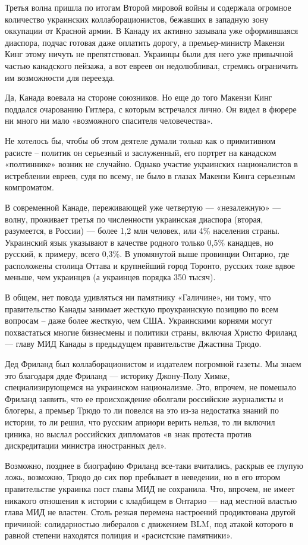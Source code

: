 \documentclass[a4paper,11pt]{extreport}
\begin{document}
Третья волна пришла по итогам Второй мировой войны и содержала огромное
количество украинских коллаборационистов, бежавших в западную зону оккупации от
Красной армии. В Канаду их активно зазывала уже оформившаяся диаспора, подчас
готовая даже оплатить дорогу, а премьер-министр Макензи Кинг этому ничуть не
препятствовал. Украинцы были для него уже привычной частью канадского пейзажа,
а вот евреев он недолюбливал, стремясь ограничить им возможности для переезда.

Да, Канада воевала на стороне союзников. Но еще до того Макензи Кинг поддался
очарованию Гитлера, с которым встречался лично. Он видел в фюрере ни много ни
мало «возможного спасителя человечества».

Не хотелось бы, чтобы об этом деятеле думали только как о примитивном расисте –
политик он серьезный и заслуженный, его портрет на канадском «полтиннике»
возник не случайно. Однако участие украинских националистов в истреблении
евреев, судя по всему, не было в глазах Макензи Кинга серьезным компроматом.

В современной Канаде, переживающей уже четвертую --- «незалежную» --- волну,
проживает третья по численности украинская диаспора (вторая, разумеется, в
России) --- более 1,2 млн человек, или 4\% населения страны. Украинский язык
указывают в качестве родного только 0,5\% канадцев, но русский, к примеру, всего
0,3\%. В упомянутой выше провинции Онтарио, где расположены столица Оттава и
крупнейший город Торонто, русских тоже вдвое меньше, чем украинцев (а украинцев
порядка 350 тысяч).

В общем, нет повода удивляться ни памятнику «Галичине», ни тому, что
правительство Канады занимает жесткую проукраинскую позицию по всем вопросам –
даже более жесткую, чем США. Украинскими корнями могут похвастаться многие
бизнесмены и политики страны, включая Христю Фриланд --- главу МИД Канады в
предыдущем правительстве Джастина Трюдо.

Дед Фриланд был коллаборационистом и издателем погромной газеты. Мы знаем это
благодаря дяде Фриланд --- историку Джону-Полу Химке, специализирующемся на
украинском национализме. Это, впрочем, не помешало Фриланд заявить, что ее
происхождение оболгали российские журналисты и блогеры, а премьер Трюдо то ли
повелся на это из-за недостатка знаний по истории, то ли решил, что русским
априори верить нельзя, то ли включил циника, но выслал российских дипломатов «в
знак протеста против дискредитации министра иностранных дел».

Возможно, позднее в биографию Фриланд все-таки вчитались, раскрыв ее глупую
ложь, возможно, Трюдо до сих пор пребывает в неведении, но в его втором
правительстве украинка пост главы МИД не сохранила. Что, впрочем, не имеет
никакого отношения к истории с кладбищем в Онтарио --- над местной властью глава
МИД не властен. Столь резкая перемена настроений продиктована другой причиной:
солидарностью либералов с движением BLM, под атакой которого в равной степени
находятся полиция и «расистские памятники».
\end{document}
